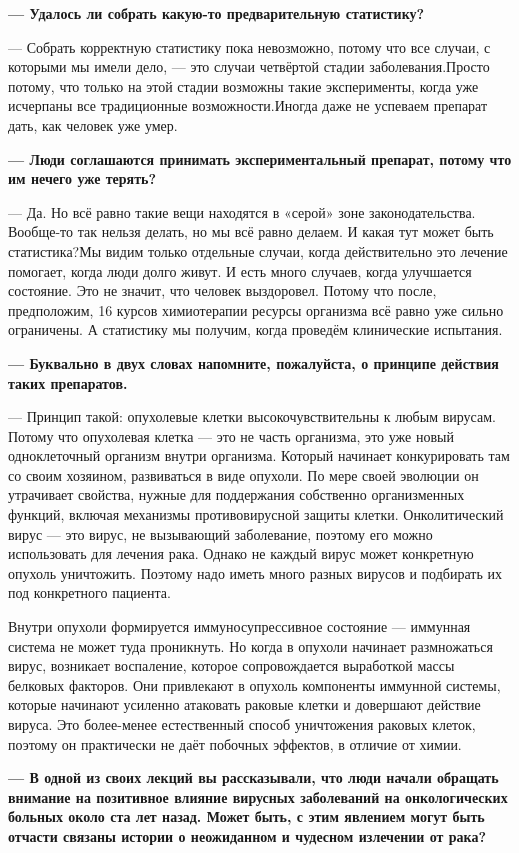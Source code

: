{\bf — Удалось ли собрать какую-то предварительную статистику? }

— Собрать корректную статистику пока невозможно, потому что все случаи, с которыми мы имели дело, — это случаи четвёртой стадии заболевания.Просто потому, что только на этой стадии возможны такие эксперименты, когда уже исчерпаны все традиционные возможности.Иногда даже не успеваем препарат дать, как человек уже умер.

{\bf — Люди соглашаются принимать экспериментальный препарат, потому что им нечего уже терять? }

— Да. Но всё равно такие вещи находятся в «серой» зоне законодательства. Вообще-то так нельзя делать, но мы всё равно делаем. И какая тут может быть статистика?Мы видим только отдельные случаи, когда действительно это лечение помогает, когда люди долго живут. И есть много случаев, когда улучшается состояние. Это не значит, что человек выздоровел. Потому что после, предположим, 16 курсов химиотерапии ресурсы организма всё равно уже сильно ограничены. А статистику мы получим, когда проведём клинические испытания.

{\bf — Буквально в двух словах напомните, пожалуйста, о принципе действия таких препаратов.}

— Принцип такой: опухолевые клетки высокочувствительны к любым вирусам. Потому что опухолевая клетка — это не часть организма, это уже новый одноклеточный организм внутри организма. Который начинает конкурировать там со своим хозяином, развиваться в виде опухоли. По мере своей эволюции он утрачивает свойства, нужные для поддержания собственно организменных функций, включая механизмы противовирусной защиты клетки. Онколитический вирус — это вирус, не вызывающий заболевание, поэтому его можно использовать для лечения рака. Однако не каждый вирус может конкретную опухоль уничтожить. Поэтому надо иметь много разных вирусов и подбирать их под конкретного пациента.

Внутри опухоли формируется иммуносупрессивное состояние — иммунная система не может туда проникнуть. Но когда в опухоли начинает размножаться вирус, возникает воспаление, которое сопровождается выработкой массы белковых факторов. Они привлекают в опухоль компоненты иммунной системы, которые начинают усиленно атаковать раковые клетки и довершают действие вируса. Это более-менее естественный способ уничтожения раковых клеток, поэтому он практически не даёт побочных эффектов, в отличие от химии.

{\bf — В одной из своих лекций вы рассказывали, что люди начали обращать внимание на позитивное влияние вирусных заболеваний на онкологических больных около ста лет назад. Может быть, с этим явлением могут быть отчасти связаны истории о неожиданном и чудесном излечении от рака? }

